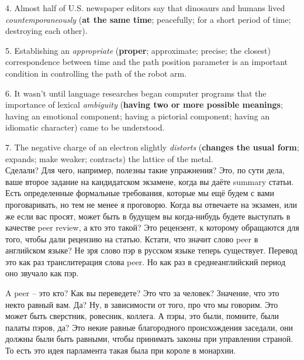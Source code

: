 \documentclass[main.tex]{subfiles}
\begin{document}
4. Almost half of U.S. newspaper editors say that dinosaurs and humans lived \textit{countemporaneously} (\textbf{at the same time}; peacefully; for a short period of time; destroying each other).

5. Establishing an \textit{appropriate} (\textbf{proper}; approximate; precise; the closest) correspondence between time and the path position parameter is an important condition in controlling the path of the robot arm.

6. It wasn't until language researches began computer programs that the importance of lexical \textit{ambiguity} (\textbf{having two or more possible meanings}; having an emotional component; having a pictorial component; having an idiomatic character) came to be understood.

7. The negative charge of an electron slightly \textit{distorts} (\textbf{changes the usual form}; expands; make weaker; contracts) the lattice of the metal.
\\

Сделали?
Для чего, например, полезны такие упражнения?
Это, по сути дела, ваше второе задание на кандидатском экзамене, когда вы даёте summary статьи.
Есть определенные формальные требования, которые мы ещё будем с вами проговаривать, но тем не менее я проговорю.
Когда вы отвечаете на экзамен, или же если вас просят, может быть в будущем вы когда-нибудь будете выступать в качестве peer review, а кто это такой?
Это рецензент, к которому обращаются для того, чтобы дали рецензию на статью.
Кстати, что значит слово peer в английском языке?
Не зря слово пэр в русском языке теперь существует.
Перевод это как раз транслитерация слова peer.
Но как раз в среднеанглийский период оно звучало как пэр.

A peer -- это кто?
Как вы переведете?
Это что за человек?
Значение, что это некто равный вам.
Да?
Ну, в зависимости от того, про что мы говорим.
Это может быть сверстник, ровесник, коллега.
А пэры, это были, помните, были палаты пэров, да?
Это некие равные благородного происхождения заседали, они должны были быть равными, чтобы принимать законы при управлении страной.
То есть это идея парламента такая была при короле в монархии.
\end{document}
